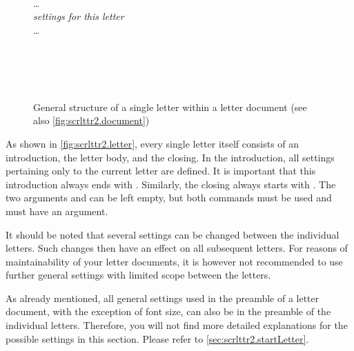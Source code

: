 \begin{figure}
{{      \\
    \dots\\
    {\centering\emph{settings for this letter}\\}
    \dots\\
    \\
  }}\\
\\
\\
\caption{General structure of a single letter within a letter
document (see also \autoref{fig:scrlttr2.document})}
\label{fig:scrlttr2.letter}
\end{figure}

As shown in \autoref{fig:scrlttr2.letter}, every single letter itself
consists of an introduction, the letter body, and the closing. In the
introduction, all settings pertaining only to the current letter are
defined. It is important that this introduction always ends with
. Similarly, the closing always starts with
. The two arguments  and 
can be left empty, but both commands must be used and must have an
argument.

\begin{Explain}
  It should be noted that several settings can be changed between the
  individual letters. Such changes then have an effect on all
  subsequent letters. For reasons of maintainability of your letter
  documents, it is however not recommended to use further general
  settings with limited scope between the letters.
\end{Explain}

As already mentioned, all general settings used in the preamble of a
letter document, with the exception of font size, can also be in the
preamble of the individual letters. Therefore, you will not find more
detailed explanations for the possible settings in this
section. Please refer to \autoref{sec:scrlttr2.startLetter}.


